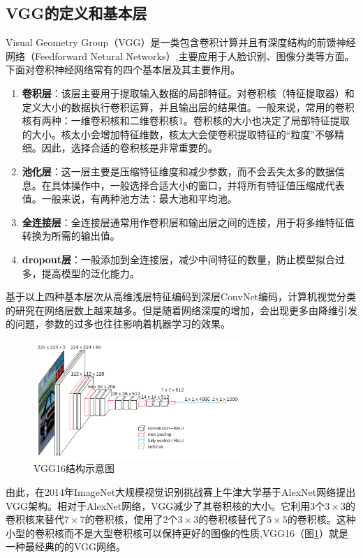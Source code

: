\subsection{VGG的定义和基本层}
Visual Geometry Group（VGG）是一类包含卷积计算并且有深度结构的前馈神经网络（Feedforward Netural Networks）\cite{lecun1998gradient},主要应用于人脸识别、图像分类等方面。下面对卷积神经网络常有的四个基本层及其主要作用。
\begin{enumerate}
\item \textbf{卷积层}：该层主要用于提取输入数据的局部特征。对卷积核（特征提取器）和定义大小的数据执行卷积运算，并且输出层的结果值。一般来说，常用的卷积核有两种：一维卷积核和二维卷积核1。卷积核的大小也决定了局部特征提取的大小。核太小会增加特征维数，核太大会使卷积提取特征的“粒度”不够精细。因此，选择合适的卷积核是非常重要的。
\item \textbf{池化层}：这一层主要是压缩特征维度和减少参数，而不会丢失太多的数据信息。在具体操作中，一般选择合适大小的窗口，并将所有特征值压缩成代表值。一般来说，有两种池方法：最大池和平均池。
\item \textbf{全连接层}：全连接层通常用作卷积层和输出层之间的连接，用于将多维特征值转换为所需的输出值。
\item \textbf{dropout层}：一般添加到全连接层，减少中间特征的数量，防止模型拟合过多，提高模型的泛化能力。
\end{enumerate}

基于以上四种基本层次从高维浅层特征编码到深层ConvNet编码，计算机视觉分类的研究在网络层数上越来越多。但是随着网络深度的增加，会出现更多由降维引发的问题，参数的过多也往往影响着机器学习的效果。
     \begin{figure}[h]
      \centering
      \includegraphics[width=0.7\textwidth]{figures/VGG16.png}
      \caption{VGG16结构示意图}
      \label{fig:vgg16}
    \end{figure}

由此，在2014年ImageNet大规模视觉识别挑战赛上牛津大学基于AlexNet网络提出VGG架构。相对于AlexNet网络，VGG减少了其卷积核的大小。它利用3个\(3\times3\)的卷积核来替代\(7\times7\)的卷积核，使用了2个\(3\times3\)的卷积核替代了\(5\times5\)的卷积核\cite{simonyan2014very}。这种小型的卷积核而不是大型卷积核可以保持更好的图像的性质,VGG16（图\ref{fig:vgg16}）就是一种最经典的的VGG网络。

